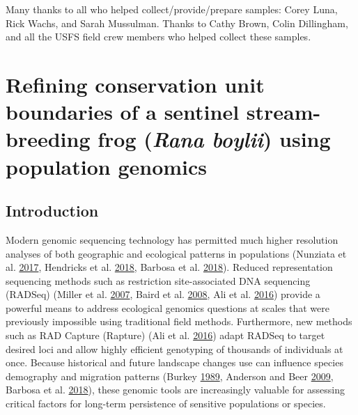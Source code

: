 \documentclass[proquest,12pt,final]{ucthesis-CA2012} %
\begin{document}
\begin{ucmainmatter}
Many thanks to all who helped collect/provide/prepare samples: Corey
Luna, Rick Wachs, and Sarah Mussulman. Thanks to Cathy Brown, Colin
Dillingham, and all the USFS field crew members who helped collect these
samples.

\hypertarget{rangewide}{%
\chapter{\texorpdfstring{Refining conservation unit boundaries of a
sentinel stream-breeding frog (\emph{Rana boylii}) using population
genomics}{Refining conservation unit boundaries of a sentinel stream-breeding frog (Rana boylii) using population genomics}}\label{rangewide}}

\hypertarget{introduction-2}{%
\section{Introduction}\label{introduction-2}}

Modern genomic sequencing technology has permitted much higher
resolution analyses of both geographic and ecological patterns in
populations (Nunziata et al.
\protect\hyperlink{ref-nunziata_genomic_2017}{2017}, Hendricks et al.
\protect\hyperlink{ref-hendricks_recent_2018}{2018}, Barbosa et al.
\protect\hyperlink{ref-barbosa_integrative_2018}{2018}). Reduced
representation sequencing methods such as restriction site-associated
DNA sequencing (RADSeq) (Miller et al.
\protect\hyperlink{ref-miller_rapid_2007}{2007}, Baird et al.
\protect\hyperlink{ref-baird_rapid_2008}{2008}, Ali et al.
\protect\hyperlink{ref-ali_rad_2016}{2016}) provide a powerful means to
address ecological genomics questions at scales that were previously
impossible using traditional field methods. Furthermore, new methods
such as RAD Capture (Rapture) (Ali et al.
\protect\hyperlink{ref-ali_rad_2016}{2016}) adapt RADSeq to target
desired loci and allow highly efficient genotyping of thousands of
individuals at once. Because historical and future landscape changes use
can influence species demography and migration patterns (Burkey
\protect\hyperlink{ref-burkey_extinction_1989}{1989}, Anderson and Beer
\protect\hyperlink{ref-anderson_oceanic_2009}{2009}, Barbosa et al.
\protect\hyperlink{ref-barbosa_integrative_2018}{2018}), these genomic
tools are increasingly valuable for assessing critical factors for
long-term persistence of sensitive populations or species.


\end{ucmainmatter}
\end{document}
